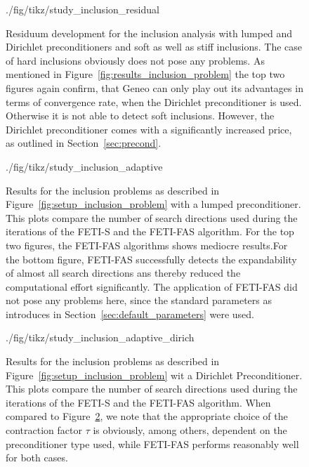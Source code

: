 \begin{figure}[tb]
  \begin{center}
    {./fig/tikz/study_inclusion_residual}
    \caption[Study of inclusion handling: residua]{Residuum development for the inclusion analysis with lumped and Dirichlet preconditioners and soft as well as stiff inclusions. The case of hard inclusions obviously does not pose any problems. As mentioned in Figure~\ref{fig:results_inclusion_problem} the top two figures again confirm, that Geneo can only play out its advantages in terms of convergence rate, when the Dirichlet preconditioner is used. Otherwise it is not able to detect soft inclusions. However, the Dirichlet preconditioner comes with a significantly increased price, as outlined in Section~\ref{sec:precond}. }
    \label{fig:results_inclusion_problem_residuum}
  \end{center}
\end{figure}


\begin{figure}[tb]
  \begin{center}
    {./fig/tikz/study_inclusion_adaptive}
    \caption[Study of inclusion handling: \# search directions with lumped preconditioner]{Results for the inclusion problems as described in Figure~\ref{fig:setup_inclusion_problem} with a lumped preconditioner. This plots compare the number of search directions used during the iterations of the FETI-S and the FETI-FAS algorithm. For the top two figures, the FETI-FAS algorithms shows mediocre results.For the bottom figure, FETI-FAS successfully detects the expandability of almost all search directions ans thereby reduced the computational effort significantly. The application of FETI-FAS did not pose any problems here, since the standard parameters as introduces in Section~\ref{sec:default_parameters} were used. }
    \label{fig:results_inclusion_problem_adaptive}
  \end{center}
\end{figure}

\begin{figure}[tb]
  \begin{center}
    {./fig/tikz/study_inclusion_adaptive_dirich}
    \caption[Study of inclusion handling: \# search directions with Dirichlet preconditioner]{Results for the inclusion problems as described in Figure~\ref{fig:setup_inclusion_problem} wit a Dirichlet Preconditioner. This plots compare the number of search directions used during the iterations of the FETI-S and the FETI-FAS algorithm. When compared to Figure~\ref{fig:results_inclusion_problem_adaptive}, we note that the appropriate choice of the contraction factor $\tau$ is obviously, among others, dependent on the preconditioner type used, while FETI-FAS  performs reasonably well for both cases.}
    \label{fig:results_inclusion_problem_adaptive_dirich}
  \end{center}
\end{figure}



